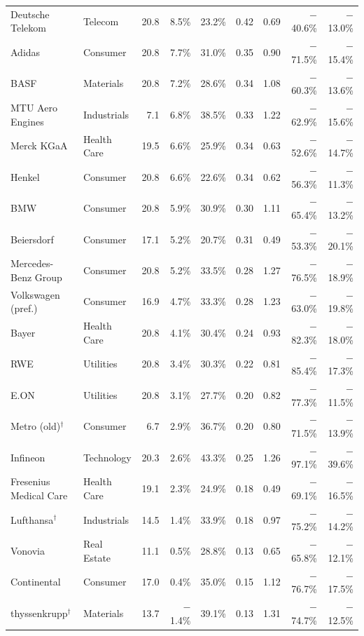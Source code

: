 \begin{longtable}{llrrrrrrr}
Deutsche Telekom & Telecom & 20.8 & 8.5\% & 23.2\% & 0.42 & 0.69 & $-$40.6\% & $-$13.0\% \\
Adidas & Consumer & 20.8 & 7.7\% & 31.0\% & 0.35 & 0.90 & $-$71.5\% & $-$15.4\% \\
BASF & Materials & 20.8 & 7.2\% & 28.6\% & 0.34 & 1.08 & $-$60.3\% & $-$13.6\% \\
MTU Aero Engines & Industrials & 7.1 & 6.8\% & 38.5\% & 0.33 & 1.22 & $-$62.9\% & $-$15.6\% \\
Merck KGaA & Health Care & 19.5 & 6.6\% & 25.9\% & 0.34 & 0.63 & $-$52.6\% & $-$14.7\% \\
Henkel & Consumer & 20.8 & 6.6\% & 22.6\% & 0.34 & 0.62 & $-$56.3\% & $-$11.3\% \\
BMW & Consumer & 20.8 & 5.9\% & 30.9\% & 0.30 & 1.11 & $-$65.4\% & $-$13.2\% \\
Beiersdorf & Consumer & 17.1 & 5.2\% & 20.7\% & 0.31 & 0.49 & $-$53.3\% & $-$20.1\% \\
Mercedes-Benz Group & Consumer & 20.8 & 5.2\% & 33.5\% & 0.28 & 1.27 & $-$76.5\% & $-$18.9\% \\
Volkswagen (pref.) & Consumer & 16.9 & 4.7\% & 33.3\% & 0.28 & 1.23 & $-$63.0\% & $-$19.8\% \\
Bayer & Health Care & 20.8 & 4.1\% & 30.4\% & 0.24 & 0.93 & $-$82.3\% & $-$18.0\% \\
RWE & Utilities & 20.8 & 3.4\% & 30.3\% & 0.22 & 0.81 & $-$85.4\% & $-$17.3\% \\
E.ON & Utilities & 20.8 & 3.1\% & 27.7\% & 0.20 & 0.82 & $-$77.3\% & $-$11.5\% \\
Metro (old)$^{\dagger}$ & Consumer & 6.7 & 2.9\% & 36.7\% & 0.20 & 0.80 & $-$71.5\% & $-$13.9\% \\
Infineon & Technology & 20.3 & 2.6\% & 43.3\% & 0.25 & 1.26 & $-$97.1\% & $-$39.6\% \\
Fresenius Medical Care & Health Care & 19.1 & 2.3\% & 24.9\% & 0.18 & 0.49 & $-$69.1\% & $-$16.5\% \\
Lufthansa$^{\dagger}$ & Industrials & 14.5 & 1.4\% & 33.9\% & 0.18 & 0.97 & $-$75.2\% & $-$14.2\% \\
Vonovia & Real Estate & 11.1 & 0.5\% & 28.8\% & 0.13 & 0.65 & $-$65.8\% & $-$12.1\% \\
Continental & Consumer & 17.0 & 0.4\% & 35.0\% & 0.15 & 1.12 & $-$76.7\% & $-$17.5\% \\
thyssenkrupp$^{\dagger}$ & Materials & 13.7 & $-$1.4\% & 39.1\% & 0.13 & 1.31 & $-$74.7\% & $-$12.5\% \\

\end{longtable}
